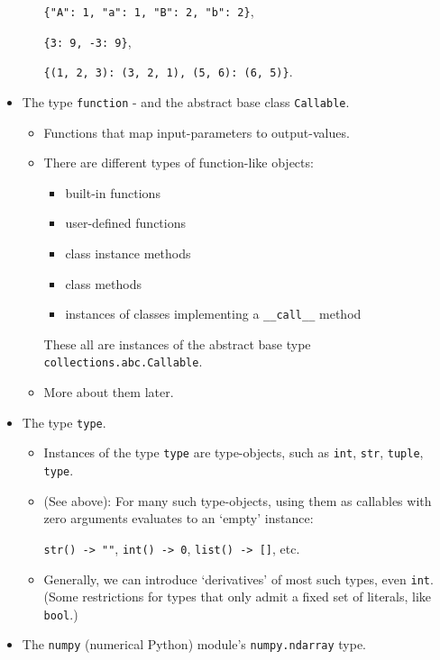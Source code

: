 \documentclass[11pt]{article}
\providecommand{\tightlist}{%
      \setlength{\itemsep}{0pt}\setlength{\parskip}{0pt}}
\begin{document}
\begin{itemize}
\begin{itemize}
    \texttt{\{"A":\ 1,\ "a":\ 1,\ "B":\ 2,\ "b":\ 2\}},

    \texttt{\{3:\ 9,\ -3:\ 9\}},

    \texttt{\{(1,\ 2,\ 3):\ (3,\ 2,\ 1),\ (5,\ 6):\ (6,\ 5)\}}.
  \end{itemize}
\item
  The type \texttt{function} - and the abstract base class
  \texttt{Callable}.

  \begin{itemize}
  \tightlist
  \item
    Functions that map input-parameters to output-values.
  \item
    There are different types of function-like objects:

    \begin{itemize}
    \tightlist
    \item
      built-in functions
    \item
      user-defined functions
    \item
      class instance methods
    \item
      class methods
    \item
      instances of classes implementing a \texttt{\_\_call\_\_} method
    \end{itemize}

    These all are instances of the abstract base type
    \texttt{collections.abc.Callable}.
  \item
    More about them later.
  \end{itemize}
\item
  The type \texttt{type}.

  \begin{itemize}
  \item
    Instances of the type \texttt{type} are type-objects, such as
    \texttt{int}, \texttt{str}, \texttt{tuple}, \texttt{type}.
  \item
    (See above): For many such type-objects, using them as callables
    with zero arguments evaluates to an `empty' instance:

    \texttt{str()\ -\textgreater{}\ ""},
    \texttt{int()\ -\textgreater{}\ 0},
    \texttt{list()\ -\textgreater{}\ {[}{]}}, etc.
  \item
    Generally, we can introduce `derivatives' of most such types, even
    \texttt{int}. (Some restrictions for types that only admit a fixed
    set of literals, like \texttt{bool}.)
  \end{itemize}
\item
  The \texttt{numpy} (numerical Python) module's \texttt{numpy.ndarray}
  type.


\end{itemize}
\end{document}
